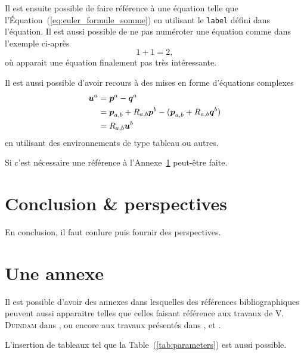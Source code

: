 \documentclass[a4paper,11pt]{scrbook}
\newcommand{\tens}[1]{#1}
\providecommand{\vect}[1]{\mbox{\boldmath${#1}$}}%
\newcommand{\ft}[2]{\ensuremath{_{#1,#2}}} 			%
\newcommand{\rt}[1]{\ensuremath{^{#1}}}				%
\newcommand{\Rot}{\ensuremath{\tens{R}}}			%
\newcommand{\pt}[1][p]{\ensuremath{\vect{#1}}}		%
\newcommand{\ve}[1][u]{\ensuremath{\vect{#1}}}		%
\newcommand{\Equation}[1]{Équation~(\ref{#1})}
\newcommand{\Appendix}[1]{Annexe~\ref{#1}}
\newcommand{\Table}[1]{Table~(\ref{#1})}
\begin{document}
Il est ensuite possible de faire référence à une équation telle que l'\Equation{eq:euler_formule_somme} en utilisant le \lstinline[language=tex]{label} défini dans l'équation. Il est aussi possible de ne pas numéroter une équation comme dans l'exemple ci-après
\begin{equation}
	1+1=2, \nonumber
\end{equation}
où apparait une équation finalement pas très intéressante.

Il est aussi possible d'avoir recours à des mises en forme d'équations complexes
\begin{align}
\ve\rt{a} & = \pt\rt{a} - \pt[q]\rt{a}   \nonumber \\
          & = \pt\ft{a}{b}+\Rot\ft{a}{b}\pt\rt{b} - (\pt\ft{a}{b}+\Rot\ft{a}{b}\pt[q]\rt{b})  \nonumber \\
          & = \Rot\ft{a}{b} \ve\rt{b}  \label{eq:meca:transform_a_vector}
\end{align}
en utilisant des environnements de type tableau ou autres.

Si c'est nécessaire une référence à l'\Appendix{chap:mon_annexe} peut-être faite.


\chapter*{Conclusion \& perspectives}

En conclusion, il faut conlure puis fournir des perspectives.

\appendix
\chapter{Une annexe} \label{chap:mon_annexe}

Il est possible d'avoir des annexes dans lesquelles des références bibliographiques peuvent aussi apparaitre telles que celles faisant référence aux travaux de \textsc{V. Duindam} dans \cite{Duindam2006}, \cite{Duindam2007} ou encore aux travaux présentés dans \cite{Park2005}, \cite{Murray1994} et \cite{Ibanez2011}.

L'insertion de tableaux tel que la \Table{tab:parameters} est aussi possible.
\end{document}
